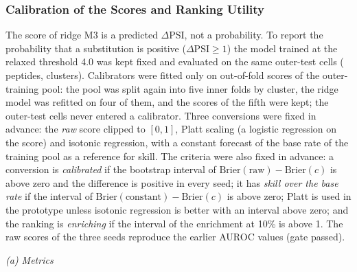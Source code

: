 \subsubsection{Calibration of the Scores and Ranking Utility}\label{sec:res-calibration}
The score of ridge M3 is a predicted $\Delta$PSI, not a probability. To report the probability that a substitution is positive
($\Delta\mathrm{PSI}\ge1$) the model trained at the relaxed threshold 4.0 was kept fixed and evaluated on the same \nCalNCells{}
outer-test cells (\nNPep{} peptides, \nCalNClu{} clusters). Calibrators were fitted only on out-of-fold scores of the
outer-training pool: the pool was split again into five inner folds by cluster, the ridge model was refitted on four of them,
and the scores of the fifth were kept; the outer-test cells never entered a calibrator. Three conversions were fixed in
advance: the \emph{raw} score clipped to $[0,1]$, Platt scaling (a logistic regression on the score) and isotonic regression, with a constant
forecast of the base rate of the training pool as a reference for skill. The criteria were also fixed in advance: a conversion is
\emph{calibrated} if the bootstrap interval of $\mathrm{Brier}(\text{raw})-\mathrm{Brier}(c)$ is above zero and the difference is positive in
every seed; it has \emph{skill over the base rate} if the interval of $\mathrm{Brier}(\text{constant})-\mathrm{Brier}(c)$ is above zero; Platt
is used in the prototype unless isotonic regression is better with an interval above zero; and the ranking is \emph{enriching} if the
interval of the enrichment at 10\% is above 1. The raw scores of the three seeds reproduce the earlier AUROC values (gate passed).

\begin{table}[htbp]
  \centering
  \caption[Probability quality on the outer-test cells]{Probability quality on the outer-test cells (observed fraction of positive cells: \nCalObs). ECE: expected calibration
  error over ten equal-mass bins; $\hat p$: predicted probability. (a) Metrics per mapping.
  (b) Pre-registered comparisons of the Brier score.}\label{tab:calmetrics}
  {\small\textit{(a) Metrics}}\par\smallskip
  
  \par{}\par\smallskip
  
\end{table}


